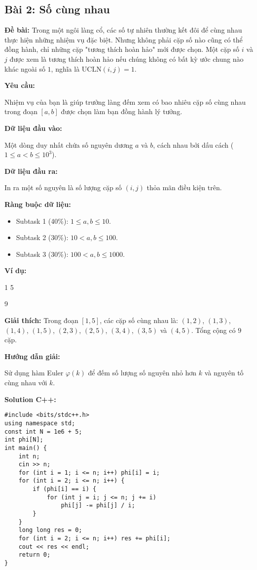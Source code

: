 \documentclass[12pt]{scrartcl}  %
\begin{document}
\subsection{Bài 2: Số cùng nhau}
\textbf{Đề bài:}
Trong một ngôi làng cổ, các số tự nhiên thường kết đôi để cùng nhau thực hiện những nhiệm vụ đặc biệt. Nhưng không phải cặp số nào cũng có thể đồng hành, chỉ những cặp "tương thích hoàn hảo" mới được chọn. Một cặp số $i$ và $j$ được xem là tương thích hoàn hảo nếu chúng không có bất kỳ ước chung nào khác ngoài số $1$, nghĩa là $\mathrm{UCLN}(i, j) = 1$.

\textbf{Yêu cầu:}

Nhiệm vụ của bạn là giúp trưởng làng đếm xem có bao nhiêu cặp số cùng nhau trong đoạn $[a, b]$ được chọn làm bạn đồng hành lý tưởng.

\textbf{Dữ liệu đầu vào:}

Một dòng duy nhất chứa số nguyên dương $a$ và $b$, cách nhau bởi dấu cách ($1 \leq a < b \leq 10^3$).

\textbf{Dữ liệu đầu ra:}

In ra một số nguyên là số lượng cặp số $(i, j)$ thỏa mãn điều kiện trên.

\textbf{Ràng buộc dữ liệu:}

\begin{itemize}
    \item Subtask 1 (40\%): $1 \leq a, b \leq 10$.
    \item Subtask 2 (30\%): $10 < a, b \leq 100$.
    \item Subtask 3 (30\%): $100 < a, b \leq 1000$.
\end{itemize}

\textbf{Ví dụ:}
\begin{tcolorbox}[colback=gray!5!white, colframe=blue!50!black, title=Input]
1 5
\end{tcolorbox}
\begin{tcolorbox}[colback=gray!5!white, colframe=green!50!black, title=Output]
9
\end{tcolorbox}

\textbf{Giải thích:}
Trong đoạn $[1, 5]$, các cặp số cùng nhau là: $(1, 2)$, $(1, 3)$, $(1, 4)$, $(1, 5)$, $(2, 3)$, $(2, 5)$, $(3, 4)$, $(3, 5)$ và $(4, 5)$. Tổng cộng có $9$ cặp.

\textbf{Hướng dẫn giải:}

Sử dụng hàm Euler $\varphi(k)$ để đếm số lượng số nguyên nhỏ hơn $k$ và nguyên tố cùng nhau với $k$.

\textbf{Solution C++:}
\begin{lstlisting}
#include <bits/stdc++.h>
using namespace std;
const int N = 1e6 + 5;
int phi[N];
int main() {
    int n;
    cin >> n;
    for (int i = 1; i <= n; i++) phi[i] = i;
    for (int i = 2; i <= n; i++) {
        if (phi[i] == i) {
            for (int j = i; j <= n; j += i)
                phi[j] -= phi[j] / i;
        }
    }
    long long res = 0;
    for (int i = 2; i <= n; i++) res += phi[i];
    cout << res << endl;
    return 0;
}
\end{lstlisting}
\end{document}
